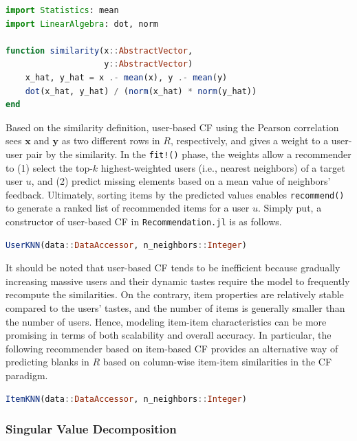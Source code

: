 \begin{lstlisting}[language = Julia]
import Statistics: mean
import LinearAlgebra: dot, norm

function similarity(x::AbstractVector,
                    y::AbstractVector)
    x_hat, y_hat = x .- mean(x), y .- mean(y)
    dot(x_hat, y_hat) / (norm(x_hat) * norm(y_hat))
end
\end{lstlisting}

Based on the similarity definition, user-based CF using the Pearson correlation \cite{Herlocker1999} sees $\mathbf{x}$ and $\mathbf{y}$ as two different rows in $R$, respectively, and gives a weight to a user-user pair by the similarity. In the \texttt{fit!()} phase, the weights allow a recommender to (1) select the top-$k$ highest-weighted users (i.e., nearest neighbors) of a target user $u$, and (2) predict missing elements based on a mean value of neighbors' feedback. Ultimately, sorting items by the predicted values enables \texttt{recommend()} to generate a ranked list of recommended items for a user $u$. Simply put, a constructor of user-based CF in \texttt{Recommendation.jl} is as follows.

\begin{lstlisting}[language = Julia]
UserKNN(data::DataAccessor, n_neighbors::Integer)
\end{lstlisting}

It should be noted that user-based CF tends to be inefficient because gradually increasing massive users and their dynamic tastes require the model to frequently recompute the similarities. On the contrary, item properties are relatively stable compared to the users' tastes, and the number of items is generally smaller than the number of users. Hence, modeling item-item characteristics can be more promising in terms of both scalability and overall accuracy. In particular, the following recommender based on item-based CF \cite{Sarwar2001,Deshpande2004} provides an alternative way of predicting blanks in $R$ based on column-wise item-item similarities in the CF paradigm.

\begin{lstlisting}[language = Julia]
ItemKNN(data::DataAccessor, n_neighbors::Integer)
\end{lstlisting}

\subsubsection{Singular Value Decomposition}

